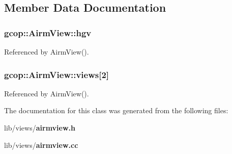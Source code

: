 \subsection{\-Member \-Data \-Documentation}
\subsubsection[{hgv}]{ {\bf gcop\-::\-Airm\-View\-::hgv}}\label{classgcop_1_1AirmView_a9b46f1fa12ec86e42393055920115a4f}


\-Referenced by \-Airm\-View().

\subsubsection[{views}]{ {\bf gcop\-::\-Airm\-View\-::views}[2]}\label{classgcop_1_1AirmView_acedc4cbaa0d23544e2195ee8233978f1}


\-Referenced by \-Airm\-View().



\-The documentation for this class was generated from the following files\-:\begin{DoxyCompactItemize}
\item 
lib/views/{\bf airmview.\-h}\item 
lib/views/{\bf airmview.\-cc}\end{DoxyCompactItemize}
